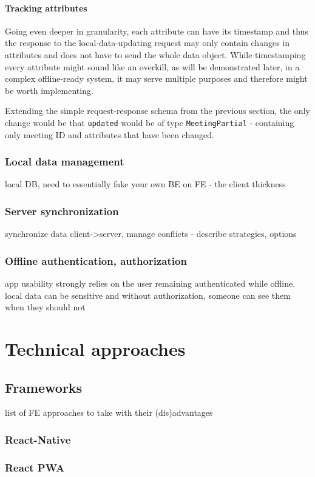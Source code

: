 \documentclass[
  digital,     %
  color,       %
  oneside,     %
  nosansbold,  %
  nocolorbold, %
  lof,         %
  lot,         %
]{fithesis4}
\begin{document}
\subsubsection{Tracking attributes}
Going even deeper in granularity, each attribute can have its timestamp and thus the response to the local-data-updating request may only contain changes in attributes and does not have to send the whole data object. While timestamping every attribute might sound like an overkill, as will be demonstrated later, in a complex offline-ready system, it may serve multiple purposes and therefore might be worth implementing.

Extending the simple request-response schema from the previous section, the only change would be that \texttt{updated} would be of type \texttt{MeetingPartial} - containing only meeting ID and attributes that have been changed.

\subsection{Local data management}
local DB, need to essentially fake your own BE on FE - the client thickness
\subsection{Server synchronization}
synchronize data client->server, manage conflicts - describe strategies, options
\subsection{Offline authentication, authorization}
app usability strongly relies on the user remaining authenticated while offline. local data can be sensitive and without authorization, someone can see them when they should not

\chapter{Technical approaches}
\section{Frameworks}
list of FE approaches to take with their (dis)advantages
\subsection{React-Native}
\subsection{React PWA}
\end{document}
